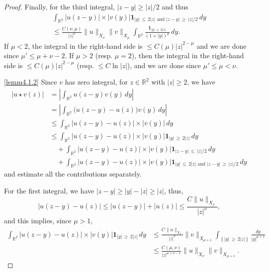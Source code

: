 \documentclass[10pt]{amsart}
\theoremstyle{definition}\newtheorem{defi}[theo]{Definition}\newtheorem{rema}[theo]{Remark}\newtheorem{exam}[theo]{Example}\newtheorem{exem}[theo]{Example}\newtheorem{nota}[theo]{Notation}
\newcommand*\R{\mathbb R}
\newcommand{\bfun}{\mathbf{1}}
\newcommand*\gs{\geqslant }
\newcommand*\ls{\leqslant }
\begin{document}
\begin{proof}
Finally, for the third integral, $ |z-y| \gs |z| /2 $ and thus
\begin{multline*}
\int_{\R^2} \lvert u (z-y) \rvert \times \lvert v(y) \rvert \bfun_{|y|\,\ls\,2 |z| \text{ and } |z-y|\,\gs\,|z| /2 } \, dy \\ \ls \frac{C(\nu, \mu)}{|z|^\nu} \| u \|_{X_{\nu}} \| v \|_{X_{\mu}}
\int_{\R^2} \frac{\bfun_{|y|\,\ls\,2 |z| }}{ (1+|y|)^\mu} \, dy.
\end{multline*}
If $ \mu < 2 $, the integral in the right-hand side is $ \ls C (\mu) |z|^{2 - \mu} $ and we are done since $ \mu ' \ls \mu + \nu - 2 $. If $ \mu > 2 $ (resp. $ \mu = 2 $), then the integral in the right-hand side is $ \ls C (\mu) |z|^{2 - \mu} $ (resp. $ \ls C \ln |z| $), and we are done since $ \mu ' \ls \mu < \nu $.


\noindent\eqref{lemm4.1.2} Since $ v $ has zero integral, for $ z \in \R^2 $ with $ |z| \gs 2 $, we have
\begin{align*}
\lvert u \star v (z) \rvert & = \left \lvert \int_{\R^2} u (z-y) v(y) \, dy \right\rvert
\\
& = \left \lvert \int_{\R^2} \big(u (z-y) - u (z) \big) v(y) \, dy \right \rvert
\\
& \ls \int_{\R^2} \lvert u (z-y) - u (z) \rvert \times \lvert v(y) \rvert \, dy
\\
& \ls
\int_{\R^2} \lvert u (z-y) - u (z) \rvert \times \lvert v(y) \rvert \bfun_{|y|\,\gs\,2 |z| } \, dy
\\
& \quad + \int_{\R^2} \lvert u (z-y) - u (z) \rvert \times \lvert v(y) \rvert \bfun_{ |z-y| \,\ls\,|z|/2 } \, dy
\\
& \quad + \int_{\R^2} \lvert u (z-y) - u (z) \rvert \times \lvert v(y) \rvert \bfun_{|y|\,\ls\,2 |z| \text{ and } |z-y|\,\gs\,|z| /2 } \, dy
\end{align*}
and estimate all the contributions separately.

For the first integral, we have $ |z-y| \gs |y| - |z| \gs |z| $, thus,
\[
\lvert u (z-y) - u (z) \rvert
\ls \lvert u (z-y) \rvert + \lvert u (z) \rvert
\ls \frac{C \| u \|_{X_{\nu}}}{ |z|^\nu },
\]
and this implies, since $ \mu > 1 $,
\begin{align*}
\int_{\R^2} \lvert u (z-y) - u (z) \rvert \times \lvert v(y) \rvert \bfun_{|y|\,\gs\,2 |z| } \, dy & \ls \frac{C \| u \|_{X_{\nu}} }{ |z|^\nu } \| v \|_{X_{\mu+1} }
\int_{\left\{ |y|\,\gs\,2 |z|\right\} } \frac{dy}{|y|^{\mu +1}}
\\
& \ls \frac{C(\mu, \nu)}{ |z|^{\mu + \nu -1 } } \| u \|_{X_{\nu}} \| v \|_{X_{\mu+1} }.
\end{align*}


\end{proof}
\end{document}

